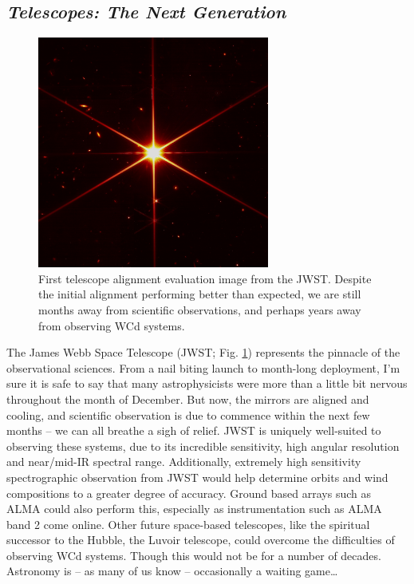 \subsection{\emph{Telescopes: The Next Generation}}

\begin{figure}
  \centering
  \includegraphics[width=3in]{assets/jwst.jpg}
  \caption[\emph{First telescope alignment evaluation image from the JWST}]{First telescope alignment evaluation image from the JWST. Despite the initial alignment performing better than expected, we are still months away from scientific observations, and perhaps years away from observing WCd systems.}
  \label{fig:jwst}
\end{figure}

The James Webb Space Telescope (JWST; Fig. \ref{fig:jwst}) represents the pinnacle of the observational sciences.
From a nail biting launch to month-long deployment, I'm sure it is safe to say that many astrophysicists were more than a little bit nervous throughout the month of December.
But now, the mirrors are aligned and cooling, and scientific observation is due to commence within the next few months -- we can all breathe a sigh of relief.
JWST is uniquely well-suited to observing these systems, due to its incredible sensitivity, high angular resolution and near/mid-IR spectral range.
Additionally, extremely high sensitivity spectrographic observation from JWST would help determine orbits and wind compositions to a greater degree of accuracy.
Ground based arrays such as ALMA could also perform this, especially as instrumentation such as ALMA band 2 come online.
Other future space-based telescopes, like the spiritual successor to the Hubble, the Luvoir telescope, could overcome the difficulties of observing WCd systems.
Though this would not be for a number of decades.
Astronomy is -- as many of us know -- occasionally a waiting game\ldots


